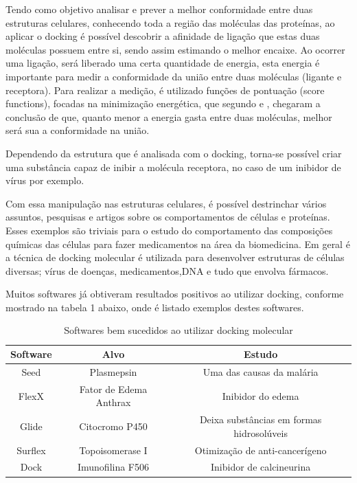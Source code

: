 \documentclass[tcc, capa]{texucpel}
\begin{document}
Tendo como objetivo analisar e prever a melhor conformidade entre duas estruturas celulares, conhecendo toda a região das moléculas das proteínas, ao aplicar o docking é possível descobrir a afinidade de ligação que estas duas moléculas possuem entre si, sendo assim estimando o melhor encaixe.
Ao ocorrer uma ligação, será liberado uma certa quantidade de energia, esta energia é importante para medir a conformidade da união entre duas moléculas (ligante e receptora).
Para realizar a medição, é utilizado funções de pontuação (score functions), focadas na minimização energética, que  segundo \cite{kitchen2004docking} e \cite{lybrand1995ligand}, chegaram a conclusão de que, quanto menor a energia gasta entre duas moléculas, melhor será sua a conformidade na união. 

Dependendo da estrutura que é analisada com o docking, torna-se possível criar uma substância capaz de inibir a molécula receptora, no caso de um inibidor de vírus por exemplo. \cite{ishikawa2011binding}

Com essa manipulação nas estruturas celulares, é possível destrinchar vários assuntos, pesquisas e artigos sobre os comportamentos de células e proteínas.
Esses exemplos são triviais para o estudo do comportamento das composições químicas das células para fazer medicamentos na área da biomedicina. 
Em geral é a técnica de docking molecular é utilizada para desenvolver estruturas de células diversas; vírus de doenças, medicamentos,DNA e tudo que envolva fármacos. 

Muitos softwares já obtiveram resultados positivos ao utilizar docking, conforme mostrado na tabela 1 abaixo, onde é listado exemplos destes softwares.
\begin{table}[h]
\centering
\caption{Softwares bem sucedidos ao utilizar docking molecular \cite{sliwoski2014computational} }

\begin{tabular}{@{}|c|c|c|@{}}
\toprule

Software & Alvo                   & Estudo                                                   \\ \midrule
Seed     & Plasmepsin             & Uma das causas da malária                                \\ \midrule
FlexX    & Fator de Edema Anthrax & Inibidor do edema                                        \\ \midrule
Glide    & Citocromo P450         & Deixa substâncias em formas hidrosolúveis         \\ \midrule
Surflex  & Topoisomerase I        & Otimização de anti-cancerígeno                           \\ \midrule
Dock     & Imunofilina F506       & Inibidor de calcineurina \\ \bottomrule
\end{tabular}
\end{table}
\end{document}
